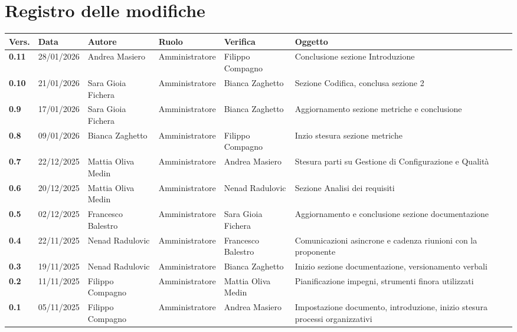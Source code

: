\documentclass[a4paper,12pt]{article}
\begin{document}


\section*{Registro delle modifiche}
    \begin{xltabular}{\textwidth}{|l|l|X|l|X|X|}
        \hline
        \textbf{Vers.} & \textbf{Data} & \textbf{Autore} & \textbf{Ruolo} & \textbf{Verifica} & \textbf{Oggetto} \\
        \hline
        \endhead

        \endfoot

        \hline
        \endlastfoot

        \textbf{0.11} & 28/01/2026 & Andrea Masiero & Amministratore & Filippo Compagno & Conclusione sezione Introduzione \\
        \hline
        \textbf{0.10} & 21/01/2026 & Sara Gioia Fichera & Amministratore & Bianca Zaghetto & Sezione Codifica, conclusa sezione 2 \\
        \hline
        \textbf{0.9} & 17/01/2026 & Sara Gioia Fichera & Amministratore & Bianca Zaghetto & Aggiornamento sezione metriche e conclusione \\
        \hline
        \textbf{0.8} & 09/01/2026 & Bianca Zaghetto & Amministratore & Filippo Compagno & Inzio stesura sezione metriche \\
        \hline
        \textbf{0.7} & 22/12/2025 & Mattia Oliva Medin & Amministratore & Andrea Masiero & Stesura parti su Gestione di Configurazione e Qualità \\
        \hline
        \textbf{0.6} & 20/12/2025 & Mattia Oliva Medin & Amministratore & Nenad Radulovic & Sezione Analisi dei requisiti \\
        \hline
        \textbf{0.5} & 02/12/2025 & Francesco Balestro & Amministratore & Sara Gioia Fichera & Aggiornamento e conclusione sezione documentazione \\
        \hline
        \textbf{0.4} & 22/11/2025 & Nenad Radulovic & Amministratore & Francesco Balestro & Comunicazioni asincrone e cadenza riunioni con la proponente \\
        \hline
        \textbf{0.3} & 19/11/2025 & Nenad Radulovic & Amministratore & Bianca Zaghetto & Inizio sezione documentazione, versionamento verbali \\
        \hline
        \textbf{0.2} & 11/11/2025 & Filippo Compagno & Amministratore & Mattia Oliva Medin & Pianificazione impegni, strumenti finora utilizzati \\
        \hline
        \textbf{0.1} & 05/11/2025 & Filippo Compagno & Amministratore & Andrea Masiero & Impostazione documento, introduzione, inizio stesura processi organizzativi \\
    \end{xltabular}
\end{document}
